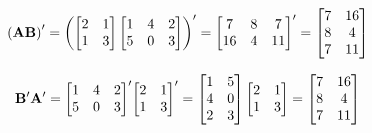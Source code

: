 \begin{enumerate}[font=\bfseries]
\begin{enumerate}
            \[
                {\left(\bold{AB}\right)}^\prime = 
                {\left(
                    \begin{bmatrix}
                        2 & 1 \\
                        1 & 3
                    \end{bmatrix}
                    \begin{bmatrix}
                        1 & 4 & 2 \\
                        5 & 0 & 3
                    \end{bmatrix}
                \right)}^\prime =
                {\begin{bmatrix}
                    7 & 8 & 7 \\
                    16 & 4 & 11
                \end{bmatrix}}^\prime =
                \begin{bmatrix}
                    7 & 16 \\
                    8 & 4 \\
                    7 & 11
                \end{bmatrix}
            \]

            \[
                \bold{B}^\prime \bold{A}^\prime =
                {\begin{bmatrix}
                    1 & 4 & 2 \\
                    5 & 0 & 3
                \end{bmatrix}}^\prime
                {\begin{bmatrix}
                    2 & 1 \\
                    1 & 3
                \end{bmatrix}}^\prime =
                \begin{bmatrix}
                    1 & 5 \\
                    4 & 0 \\
                    2 & 3
                \end{bmatrix}
                \begin{bmatrix}
                    2 & 1 \\
                    1 & 3
                \end{bmatrix} =
                \begin{bmatrix}
                    7 & 16 \\
                    8 & 4 \\
                    7 & 11
                \end{bmatrix}
            \]


\end{enumerate}
\end{enumerate}

